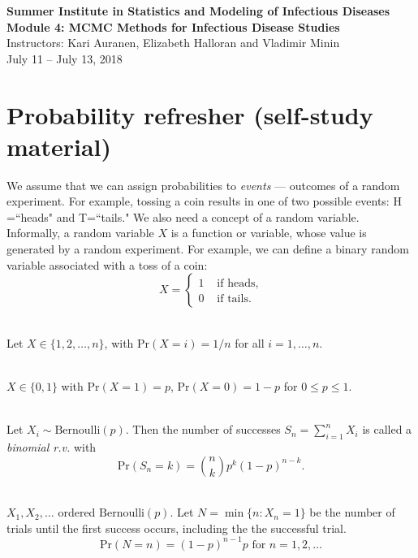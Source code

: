 \documentclass[11pt]{article}\usepackage[]{graphicx}\usepackage[]{color}
\numberwithin{algorithm}{section}
\newcommand{\prob}[1]{\ensuremath{\text{Pr}\left(#1 \right)}}
\theoremstyle{remark}
\theoremstyle{definition}
\newenvironment{example}[1]{\begin{trivlist}
\item[\hskip \labelsep {\bfseries Example}: \underline{#1}]\ \\}{\end{trivlist}}
\begin{document}


\begin{center}
  \textbf{\Large Summer Institute in Statistics and Modeling of Infectious Diseases}\\
  \textbf{\Large Module 4: MCMC Methods for Infectious Disease Studies}\\
  {\large Instructors: Kari Auranen, Elizabeth Halloran and Vladimir Minin}\\
  {\large July 11 -- July 13, 2018}
\end{center}



\section{Probability refresher (self-study material)}


We assume that we can assign probabilities to \textit{events} --- outcomes of a random experiment. For example,
tossing a coin results in one of two possible events: H =``heads" and T=``tails." We also need a concept of a random variable. Informally, a random variable $X$ is a function or variable, whose value is generated by a random experiment. For example, we can define a binary random variable associated with a toss of a coin:
\begin{equation*}
X = 
\begin{cases}
1 &\text{ if heads},\\
0 &\text{ if tails}.
\end{cases}
\end{equation*}

\begin{example}{Discrete uniform random variable}
  Let $X \in \{1,2,\dots,n\}$, with $\prob{X=i} = 1/n$ for all $i = 1,\dots,n$.
\end{example}

\begin{example}{Bernoulli r.v.}
  $X \in \{0,1\}$ with $\prob{X=1}=p$, $\prob{X=0}=1-p$ for $0 \le p \le 1$.
\end{example}

\begin{example}{Binomial r.v.}
  Let $X_i \sim \text{Bernoulli}(p)$. Then the number of successes 
  $S_n = \sum_{i=1}^n X_i$ is called a \textit{binomial r.v.} with 
  \[
  \prob{S_n=k} = {n \choose k} p^k (1-p)^{n-k}.
  \]
\end{example}

\begin{example}{Geometric r.v.}
  $X_1, X_2, \dots$ ordered $\text{Bernoulli}(p)$. Let 
  $N = \min\{n: X_n=1\}$ be the number of trials until the first success occurs, including the 
    the successful trial.
    \[
    \prob{N=n} = (1-p)^{n-1}p  \text{ for } n=1,2,\dots
    \]
\end{example}
\end{document}
